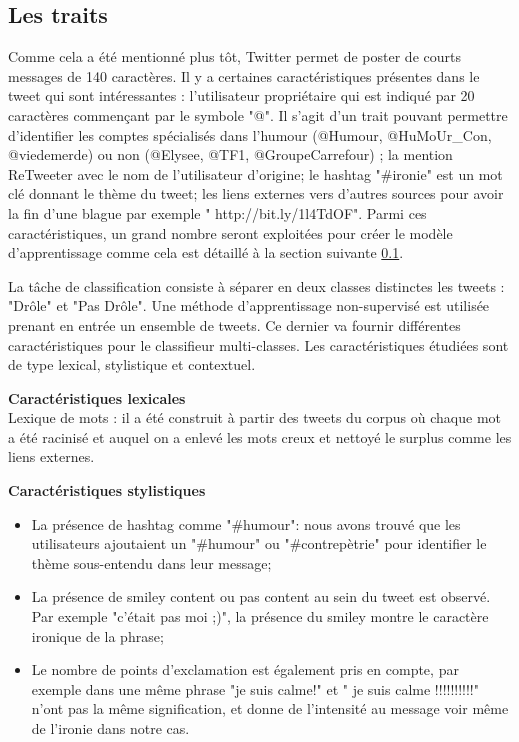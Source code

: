 \documentclass[10pt,a4paper,twoside]{article}
\begin{document}
\subsection{Les traits}
\label{features}
Comme cela a été mentionné plus tôt, Twitter permet de poster de courts messages de 140 caractères. Il y a certaines caractéristiques présentes dans le tweet qui sont intéressantes : l'utilisateur propriétaire qui est indiqué par 20 caractères commençant par le symbole "@". Il s'agit d'un trait pouvant permettre d'identifier les comptes spécialisés dans l'humour (@Humour, @HuMoUr\_Con, @viedemerde) ou non (@Elysee, @TF1, @GroupeCarrefour) ; la mention ReTweeter avec le nom de l'utilisateur d'origine; le hashtag "\#ironie" est un mot clé donnant le thème du tweet; les liens externes vers d'autres sources pour avoir la fin d'une blague par exemple " http://bit.ly/1l4TdOF". Parmi ces caractéristiques, un grand nombre seront exploitées pour créer le modèle d'apprentissage comme cela est détaillé à la section suivante \ref{features}.


La tâche de classification consiste à séparer en deux classes distinctes les tweets : "Drôle" et "Pas Drôle".
Une méthode d'apprentissage non-supervisé est utilisée prenant en entrée un ensemble de tweets. Ce dernier va fournir différentes caractéristiques pour le classifieur multi-classes. Les caractéristiques étudiées sont de type lexical, stylistique et contextuel. 

\textbf{Caractéristiques lexicales}\\
Lexique de mots : il a été construit à partir des tweets du corpus où chaque mot a été racinisé et auquel on a enlevé les mots creux et nettoyé le surplus comme les liens externes.
\vspace{0.5cm}

\textbf{Caractéristiques stylistiques}
\begin{itemize}
\item La présence de hashtag comme "\#humour": nous avons trouvé que les utilisateurs ajoutaient un "\#humour" ou "\#contrepètrie" pour identifier le thème sous-entendu dans leur message;
\item La présence de smiley content ou pas content au sein du tweet est observé. Par exemple "c'était pas moi ;)", la présence du smiley montre le caractère ironique de la phrase;
\item Le nombre de points d'exclamation est également pris en compte, par exemple dans une même phrase "je suis calme!" et " je suis calme !!!!!!!!!!" n'ont pas la même signification, et donne de l'intensité au message voir même de l'ironie dans notre cas. 
\end{itemize}
\vspace{0.5cm}
\end{document}
